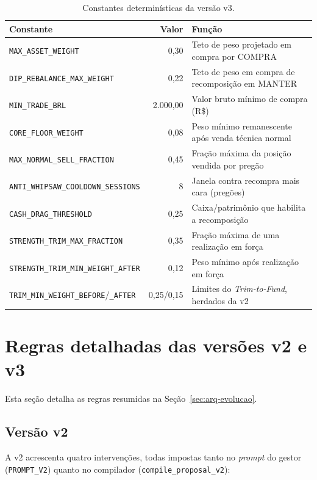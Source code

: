 \begin{table}[htbp]
\centering
\caption{Constantes determinísticas da versão v3.}
\label{tab:constantes-v3}
\small
\begin{tabular}{l r p{6.4cm}}
\toprule
\textbf{Constante} & \textbf{Valor} & \textbf{Função} \\
\midrule
\texttt{MAX\_ASSET\_WEIGHT} & 0,30 & Teto de peso projetado em compra por COMPRA \\
\texttt{DIP\_REBALANCE\_MAX\_WEIGHT} & 0,22 & Teto de peso em compra de recomposição em MANTER \\
\texttt{MIN\_TRADE\_BRL} & 2.000,00 & Valor bruto mínimo de compra (R\$) \\
\texttt{CORE\_FLOOR\_WEIGHT} & 0,08 & Peso mínimo remanescente após venda técnica normal \\
\texttt{MAX\_NORMAL\_SELL\_FRACTION} & 0,45 & Fração máxima da posição vendida por pregão \\
\texttt{ANTI\_WHIPSAW\_COOLDOWN\_SESSIONS} & 8 & Janela contra recompra mais cara (pregões) \\
\texttt{CASH\_DRAG\_THRESHOLD} & 0,25 & Caixa/patrimônio que habilita a recomposição \\
\texttt{STRENGTH\_TRIM\_MAX\_FRACTION} & 0,35 & Fração máxima de uma realização em força \\
\texttt{STRENGTH\_TRIM\_MIN\_WEIGHT\_AFTER} & 0,12 & Peso mínimo após realização em força \\
\texttt{TRIM\_MIN\_WEIGHT\_BEFORE}/\texttt{\_AFTER} & 0,25/0,15 & Limites do \textit{Trim-to-Fund}, herdados da v2 \\
\bottomrule
\end{tabular}
\end{table}

\section{Regras detalhadas das versões v2 e v3}

Esta seção detalha as regras resumidas na Seção~\ref{sec:arq-evolucao}.

\subsection{Versão v2}

A v2 acrescenta quatro intervenções, todas impostas tanto no \textit{prompt} do gestor (\texttt{PROMPT\_V2}) quanto no compilador (\texttt{compile\_proposal\_v2}):

